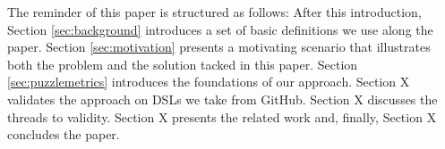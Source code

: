 The reminder of this paper is structured as follows: After this introduction, Section \ref{sec:background} introduces a set of basic definitions we use along the paper. Section \ref{sec:motivation} presents a motivating scenario that illustrates both the problem and the solution tacked in this paper. Section \ref{sec:puzzlemetrics} introduces the foundations of our approach. Section X validates the approach on DSLs we take from GitHub. Section X discusses the threads to validity. Section X presents the related work and, finally, Section X concludes the paper. 

